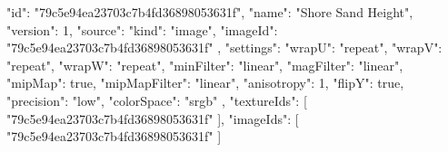 {
  "id": "79c5e94ea23703c7b4fd36898053631f",
  "name": "Shore Sand Height",
  "version": 1,
  "source": {
    "kind": "image",
    "imageId": "79c5e94ea23703c7b4fd36898053631f"
  },
  "settings": {
    "wrapU": "repeat",
    "wrapV": "repeat",
    "wrapW": "repeat",
    "minFilter": "linear",
    "magFilter": "linear",
    "mipMap": true,
    "mipMapFilter": "linear",
    "anisotropy": 1,
    "flipY": true,
    "precision": "low",
    "colorSpace": "srgb"
  },
  "textureIds": [
    "79c5e94ea23703c7b4fd36898053631f"
  ],
  "imageIds": [
    "79c5e94ea23703c7b4fd36898053631f"
  ]
}
